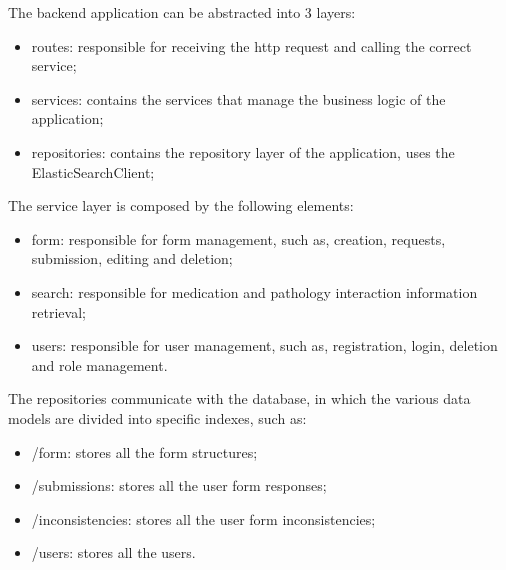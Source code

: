The backend application can be abstracted into 3 layers:
\begin{itemize}
	\item routes: responsible for receiving the http request and calling the correct service;
	\item services: contains the services that manage the business logic of the application;
	\item repositories: contains the repository layer of the application, uses the ElasticSearchClient;
\end{itemize}


%

The service layer is composed by the following elements:

\begin{itemize}
	\item form: responsible for form management, such as, creation, requests, submission, editing and deletion;
	\item search: responsible for medication and pathology interaction information retrieval;
	\item users: responsible for user management, such as, registration, login, deletion and role management.
\end{itemize}

The repositories communicate with the database, in which the various data models are divided into specific indexes, such as:

\begin{itemize}
	\item /form: stores all the form structures;
	\item /submissions: stores all the user form responses;
	\item /inconsistencies: stores all the user form inconsistencies;
	\item /users: stores all the users.
\end{itemize}

